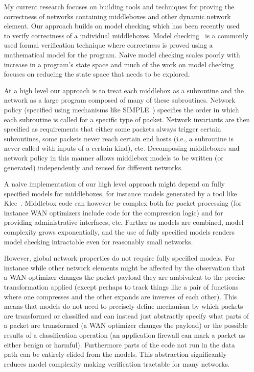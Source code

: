 \documentclass[letterpaper]{article}
\begin{document}
My current research focuses on building tools and techniques for proving the correctness of networks containing
middleboxes and other dynamic network element. Our approach builds on model checking which has been recently
used~\cite{dobrescu2014software} to verify correctness of a individual middleboxes. Model
checking~\cite{jhala2009software, han2007providing} is a commonly used formal verification technique where correctness
is proved using a mathematical model for the program.  Naive model checking scales poorly with increase in a program's
state space and much of the work on model checking focuses on reducing the state space that needs to be explored.

At a high level our approach is to treat each middlebox as a subroutine and the network as a large program composed of
many of these subroutines. Network policy (specified using mechanisms like SIMPLE~\cite{qazi2013simple}) specifies
the order in which each subroutine is called for a specific type of packet. Network invariants are then specified as
requirements that either some packets always trigger certain subroutines, some packets never reach certain end hosts
(i.e., a subroutine is never called with inputs of a certain kind), etc. Decomposing middleboxes and network policy in
this manner allows middlebox models to be written (or generated) independently and reused for different networks.

A naive implementation of our high level approach might depend on fully specified models for middleboxes, for instance
models generated by a tool like Klee~\cite{cadar2008klee}. Middlebox code can however be complex both for packet
processing (for instance WAN optimizers include code for the compression logic) and for providing administrative
interfaces, etc. Further as models are combined, model complexity grows exponentially, and the use of fully specified
models renders model checking intractable even for reasonably small networks.

However, global network properties do not require fully specified models. For instance while other
network elements might be affected by the observation that a WAN optimizer changes the packet payload they are
ambivalent to the precise transformation applied (except perhaps to track things like a pair of functions
where one compresses and the other expands are inverses of each other). This  means that models do not need to precisely
define mechanism by which packets are transformed or classified and can instead just abstractly specify what parts of a
packet are transformed (a WAN optimizer changes the payload) or the possible results of a classification operation (an
application firewall can mark a packet as either benign or harmful). Furthermore parts of the code not run in
the data path can be entirely elided from the models. This abstraction significantly reduces model complexity making
verification tractable for many networks.
\end{document}
